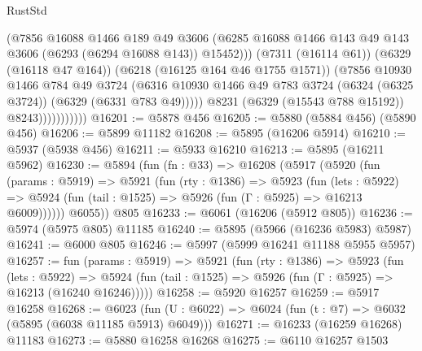 \begin{lexlean}{RustStd}
\begin{coremodule}
{{                              (@7856
                                @16088
                                @1466
                                @189
                                @49
                                @3606
                                (@6285
                                  @16088
                                  @1466
                                  @143
                                  @49
                                  @143
                                  @3606
                                  (@6293 (@6294 @16088 @143))
                                  @15452)))
                            (@7311 (@16114 @61))
                            (@6329 (@16118 @47 @164))
                            (@6218 (@16125 @164 @46 @1755 @1571))
                            (@7856
                              @10930
                              @1466
                              @784
                              @49
                              @3724
                              (@6316
                                @10930
                                @1466
                                @49
                                @783
                                @3724
                                (@6324 (@6325 @3724))
                                (@6329 (@6331 @783 @49)))))
                          @8231
                          (@6329 (@15543 @788 @15192))
                          @8243)))))))))))
@16201 := @5878 @456
@16205 := @5880 (@5884 @456) (@5890 @456)
@16206 := @5899 @11182
@16208 := @5895 (@16206 @5914)
@16210 := @5937 (@5938 @456)
@16211 := @5933 @16210
@16213 := @5895 (@16211 @5962)
@16230 := @5894
    (fun (fn : @33) =>
    @16208
      (@5917
        (@5920
          (fun (params : @5919) =>
          @5921
            (fun (rty : @1386) =>
            @5923
              (fun (lets : @5922) =>
              @5924 (fun (tail : @1525) => @5926 (fun (Γ : @5925) => @16213 @6009))))))
        @6055))
    @805
@16233 := @6061 (@16206 (@5912 @805))
@16236 := @5974 (@5975 @805) @11185
@16240 := @5895 (@5966 (@16236 @5983) @5987)
@16241 := @6000 @805
@16246 := @5997 (@5999 @16241 @11188 @5955 @5957)
@16257 := fun (params : @5919) =>
  @5921
    (fun (rty : @1386) =>
    @5923
      (fun (lets : @5922) =>
      @5924 (fun (tail : @1525) => @5926 (fun (Γ : @5925) => @16213 (@16240 @16246)))))
@16258 := @5920 @16257
@16259 := @5917 @16258
@16268 := @6023
    (fun (U : @6022) => @6024 (fun (t : @7) => @6032 (@5895 (@6038 @11185 @5913) @6049)))
@16271 := @16233 (@16259 @16268) @11183
@16273 := @5880 @16258 @16268
@16275 := @6110 @16257 @1503
}}
\end{coremodule}
\end{lexlean}
